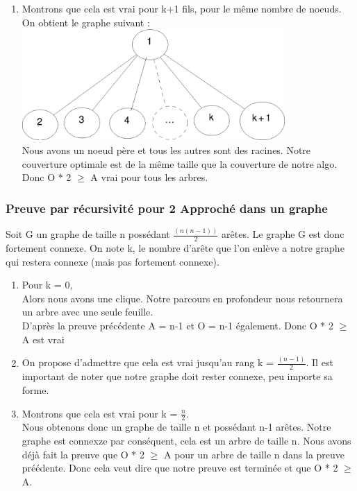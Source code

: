 \begin{enumerate}
\item Montrons que cela est vrai pour k+1 fils, pour le m\^eme nombre de noeuds.\\

On obtient le graphe suivant :\\

\bigskip
\includegraphics[width=10cm]{demo2}\\

\bigskip
Nous avons un noeud p\`ere et tous les autres sont des racines. Notre couverture optimale est de la m\^eme taille que la couverture de notre algo. Donc O  * 2 $\geq$ A vrai pour tous les arbres.

\end{enumerate}

\subsubsection{Preuve par r\'ecursivit\'e pour 2 Approch\'e dans un graphe}

Soit G un graphe de taille n poss\'edant $\frac{(n(n-1))}{2}$ ar\^etes. Le graphe G est donc fortement connexe.
On note k, le nombre d'ar\^ete que l'on enl\`eve a notre graphe qui restera connexe (mais pas fortement connexe).

\bigskip
\begin{enumerate}
 \item Pour k = 0,\\
Alors nous avons une clique. Notre parcours en profondeur nous retournera un arbre avec une seule feuille. \\
D'apr\`es la preuve pr\'ec\'edente A = n-1 et O = n-1 \'egalement. Donc O * 2 $\geq$ A est vrai

\item On propose d'admettre que cela est vrai jusqu'au rang k = $\frac{(n-1)}{2}$. Il est important de noter que notre graphe doit rester connexe, peu importe sa forme.

\item Montrons que cela est vrai pour k = $\frac{n}{2}$.\\
Nous obtenons donc un graphe de taille n et poss\'edant n-1 ar\^etes. Notre graphe est connexze par cons\'equent, cela est un arbre de taille n. Nous avons d\'ej\`a fait la preuve que O * 2 $\geq$ A pour un arbre de taille n dans la preuve pr\'e\'edente. Donc cela veut dire que notre preuve est termin\'ee et que O * 2 $\geq$ A.

\end{enumerate}